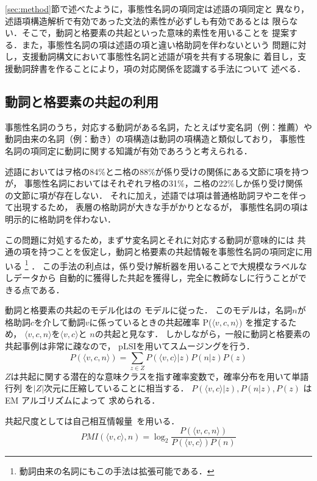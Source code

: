 \documentclass[japanese]{jnlp_1.4}
\begin{document}
\ref{sec:method}節で述べたように，事態性名詞の項同定は述語の項同定と
異なり，述語項構造解析で有効であった文法的素性が必ずしも有効であるとは
限らない．そこで，動詞と格要素の共起といった意味的素性を用いることを
提案する．また，事態性名詞の項は述語の項と違い格助詞を伴わないという
問題に対し，支援動詞構文において事態性名詞と述語が項を共有する現象に
着目し，支援動詞辞書を作ることにより，項の対応関係を認識する手法について
述べる．


\subsection{動詞と格要素の共起の利用}

事態性名詞のうち，対応する動詞がある名詞，たとえばサ変名詞（例：推薦）や
動詞由来の名詞（例：動き）の項構造は動詞の項構造と類似しており，
事態性名詞の項同定に動詞に関する知識が有効であろうと考えられる．

述語においてはヲ格の84\%とニ格の88\%が係り受けの関係にある文節に項を持つが，
事態性名詞においてはそれぞれヲ格の31\%，ニ格の22\%しか係り受け関係
の文節に項が存在しない\cite{iida:2007:NL}．
それに加え，述語では項は普通格助詞ヲやニを伴って出現するため，
表層の格助詞が大きな手がかりとなるが，
事態性名詞の項は明示的に格助詞を伴わない．

この問題に対処するため，まずサ変名詞とそれに対応する動詞が意味的には
共通の項を持つことを仮定し，動詞と格要素の共起情報を事態性名詞の項同定に用いる
\footnote{動詞由来の名詞にもこの手法は拡張可能である．}
．
この手法の利点は，係り受け解析器を用いることで大規模なラベルなしデータから
自動的に獲得した共起を獲得し，完全に教師なしに行うことができる点である．

動詞と格要素の共起のモデル化は\cite{fujita:2004:IPSJ}の
モデルに従った．
このモデルは，名詞$n$が格助詞$c$を介して動詞$v$に係っているときの共起確率
P($\langle v,c,n\rangle$) を推定するため，
$\langle v,c,n\rangle$を$\langle v,c\rangle$と
$n$の共起と見なす．
しかしながら，一般に動詞と格要素の共起事例は非常に疎なので，
pLSI\cite{hoffman:1999}を用いてスムージングを行う．
\[
    P(\langle v,c,n\rangle) = \sum_{z\in Z}P(\langle v,c\rangle|z)P(n|z)P(z)
\]
$Z$は共起に関する潜在的な意味クラスを指す確率変数で，確率分布を用いて単語行列
を$|Z|$次元に圧縮していることに相当する．
$P(\langle v,c\rangle|z),P(n|z),P(z)$ は EM アルゴリズムによって
求められる．

共起尺度としては自己相互情報量~\cite{hindle:1990:ACL}を用いる．
\[
    PMI(\langle v,c\rangle,n) = \log_2 \frac{P(\langle v,c,n\rangle)}
                                        {P(\langle v,c\rangle)P(n)}
\]
\end{document}
